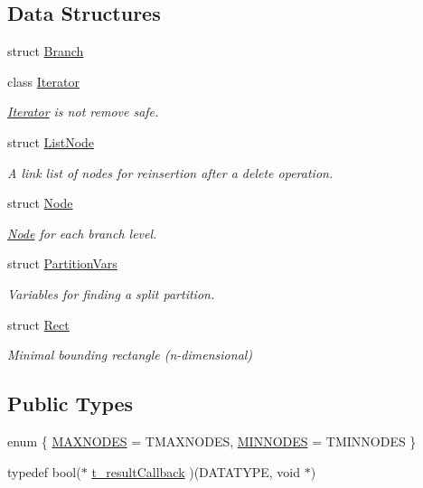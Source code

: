 \subsection*{Data Structures}
\begin{DoxyCompactItemize}
\item 
struct \hyperlink{structRTree_1_1Branch}{Branch}
\item 
class \hyperlink{classRTree_1_1Iterator}{Iterator}
\begin{DoxyCompactList}\small\item\em \hyperlink{classRTree_1_1Iterator}{Iterator} is not remove safe. \end{DoxyCompactList}\item 
struct \hyperlink{structRTree_1_1ListNode}{List\-Node}
\begin{DoxyCompactList}\small\item\em A link list of nodes for reinsertion after a delete operation. \end{DoxyCompactList}\item 
struct \hyperlink{structRTree_1_1Node}{Node}
\begin{DoxyCompactList}\small\item\em \hyperlink{structRTree_1_1Node}{Node} for each branch level. \end{DoxyCompactList}\item 
struct \hyperlink{structRTree_1_1PartitionVars}{Partition\-Vars}
\begin{DoxyCompactList}\small\item\em Variables for finding a split partition. \end{DoxyCompactList}\item 
struct \hyperlink{structRTree_1_1Rect}{Rect}
\begin{DoxyCompactList}\small\item\em Minimal bounding rectangle (n-\/dimensional) \end{DoxyCompactList}\end{DoxyCompactItemize}
\subsection*{Public Types}
\begin{DoxyCompactItemize}
\item 
enum \{ \hyperlink{classRTree_afaccb2e611f17ff46b623771ad7043d7ac05afe446df73fa67991e5199453a37f}{M\-A\-X\-N\-O\-D\-E\-S} = T\-M\-A\-X\-N\-O\-D\-E\-S, 
\hyperlink{classRTree_afaccb2e611f17ff46b623771ad7043d7a3be3d8c82fd5bfbd5e5a496e9877d71a}{M\-I\-N\-N\-O\-D\-E\-S} = T\-M\-I\-N\-N\-O\-D\-E\-S
 \}
\item 
typedef bool($\ast$ \hyperlink{classRTree_a989db5f20fcdc26231e8b76be83caee4}{t\-\_\-result\-Callback} )(D\-A\-T\-A\-T\-Y\-P\-E, void $\ast$)
\end{DoxyCompactItemize}
